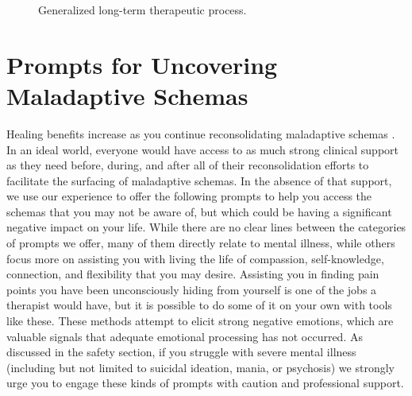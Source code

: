 \documentclass[12pt,letterpaper]{book}
\begin{document}
\begin{figure}
\begin{framed}
\end{framed}
\caption{Generalized long-term therapeutic process.}
\label{fig:process}
\end{figure}
\FloatBarrier
\section{Prompts for Uncovering Maladaptive Schemas}
\label{uncovering}
Healing benefits increase as you continue reconsolidating maladaptive schemas \cite{eckerUnlocking}. In an ideal world, everyone would have access to as much strong clinical support as they need before, during, and after all of their reconsolidation efforts to facilitate the surfacing of maladaptive schemas. In the absence of that support, we use our experience to offer the following prompts to help you access the schemas that you may not be aware of, but which could be having a significant negative impact on your life. While there are no clear lines between the categories of prompts we offer, many of them directly relate to mental illness, while others focus more on assisting you with living the life of compassion, self-knowledge, connection, and flexibility that you may desire. Assisting you in finding pain points you have been unconsciously hiding from yourself is one of the jobs a therapist would have, but it is possible to do some of it on your own with tools like these. These methods attempt to elicit strong negative emotions, which are valuable signals that adequate emotional processing has not occurred. As discussed in the safety section, if you struggle with severe mental illness (including but not limited to suicidal ideation, mania, or psychosis) we strongly urge you to engage these kinds of prompts with caution and professional support.
\end{document}

